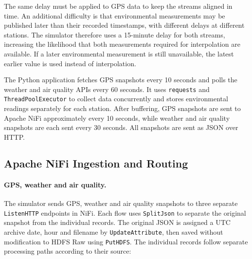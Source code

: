 \documentclass[11pt]{article}
\begin{document}
The same delay must be applied to GPS data to keep the streams aligned in time. An additional difficulty is that environmental measurements may be published later than their recorded timestamps, with different delays at different stations. The simulator therefore uses a 15-minute delay for both streams, increasing the likelihood that both measurements required for interpolation are available. If a later environmental measurement is still unavailable, the latest earlier value is used instead of interpolation.

The Python application fetches GPS snapshots every 10 seconds and polls the weather and air quality APIs every 60 seconds. It uses \texttt{requests} and \texttt{ThreadPoolExecutor} to collect data concurrently and stores environmental readings separately for each station. After buffering, GPS snapshots are sent to Apache NiFi approximately every 10 seconds, while weather and air quality snapshots are each sent every 30 seconds. All snapshots are sent as JSON over HTTP.

\subsection{Apache NiFi Ingestion and Routing}

\paragraph{GPS, weather and air quality.}
The simulator sends GPS, weather and air quality snapshots to three separate \texttt{ListenHTTP} endpoints in NiFi. Each flow uses \texttt{SplitJson} to separate the original snapshot from the individual records. The original JSON is assigned a UTC archive date, hour and filename by \texttt{UpdateAttribute}, then saved without modification to HDFS Raw using \texttt{PutHDFS}. The individual records follow separate processing paths according to their source:
\end{document}

